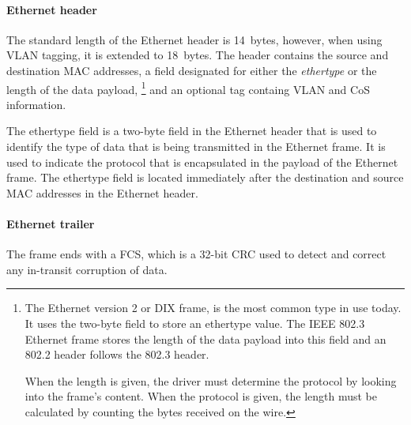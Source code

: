 \paragraph{Ethernet header}
The standard length of the Ethernet header is 14~bytes, however, when using \acs{VLAN} tagging, it is extended to 18~bytes.
The header contains the source and destination \acs{MAC} addresses, a field designated for either the \emph{ethertype} or the length of the data payload,%
   \footnote{%
      The Ethernet version 2 or \acs{DIX} frame, is the most common type in use today.
      It uses the two-byte field to store an ethertype value.
      The \acs{IEEE} 802.3 Ethernet frame stores the length of the data payload into this field and an 802.2  header follows the 802.3 header.

      When the length is given, the driver must determine the protocol by looking into the frame's content.
      When the protocol is given, the length must be calculated by counting the bytes received on the wire.
   }
and an optional  tag containg \acs{VLAN} and \acs{CoS} information.

The ethertype field is a two-byte field in the Ethernet header that is used to identify the type of data that is being transmitted in the Ethernet frame.
It is used to indicate the protocol that is encapsulated in the payload of the Ethernet frame.
The ethertype field is located immediately after the destination and source \acs{MAC} addresses in the Ethernet header.





\paragraph{Ethernet trailer}
The frame ends with a \acf{FCS}, which is a 32-bit \acf{CRC} used to detect and correct any in-transit corruption of data.

